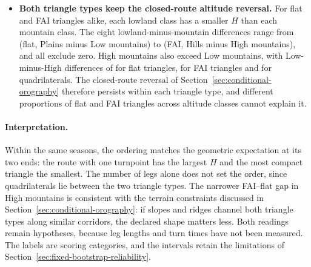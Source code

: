 \begin{itemize}
 \item \textbf{Both triangle types keep the closed-route altitude reversal.}
 For flat and FAI triangles alike, each lowland class has a smaller $H$ than
 each mountain class. The eight lowland-minus-mountain differences range from
 \RouteFlatTriangleAltZeroAltTwoDelta{} (flat, Plains minus Low mountains) to
 \RouteFaiTriangleAltOneAltThreeDelta{} (FAI, Hills minus High mountains), and
 all exclude zero. High mountains also exceed Low mountains, with
 Low-minus-High differences of \RouteFlatTriangleAltTwoAltThreeDelta{} for flat
 triangles, \RouteFaiTriangleAltTwoAltThreeDelta{} for FAI triangles and
 \RouteQuadrilateralAltTwoAltThreeDelta{} for quadrilaterals. The closed-route reversal of
 Section~\ref{sec:conditional-orography} therefore persists within each
 triangle type, and different proportions of flat and FAI triangles across
 altitude classes cannot explain it.
\end{itemize}

\paragraph{Interpretation.}
Within the same seasons, the ordering matches the geometric expectation at its
two ends: the route with one turnpoint has the largest $H$ and the most compact
triangle the smallest. The number of legs alone does not set the order, since
quadrilaterals lie between the two triangle types. The narrower FAI--flat gap in
High mountains is consistent with the terrain constraints discussed in
Section~\ref{sec:conditional-orography}: if slopes and ridges channel both
triangle types along similar corridors, the declared shape matters less. Both
readings remain hypotheses, because leg lengths and turn times have not been
measured. The labels are scoring categories, and the intervals retain the
limitations of Section~\ref{sec:fixed-bootstrap-reliability}.
\FloatBarrier
